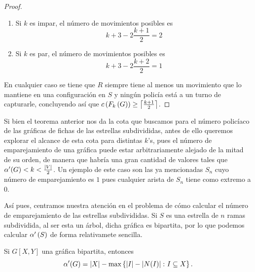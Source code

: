 \begin{proof}
    \begin{enumerate}
        \item Si $k$ es impar, el n\'umero de movimientos posibles es
                \[
                    k + 3 - 2\frac{k+1}{2} = 2
                \]
        \item Si $k$ es par, el n\'umero de movimientos posibles es
                \[
                    k + 3 - 2\frac{k+2}{2} = 1
                \]
    \end{enumerate}
    En cualquier caso se tiene que $R$ siempre tiene al menos un movimiento que
    lo mantiene en una configuraci\'on en $S$ y ning\'un polic\'ia est\'a a un
    turno de capturarle, concluyendo as\'i que $c\left( F_{k}\left( G\right)\right) \geq
    \left\lceil\frac{k+1}{2}\right\rceil$.

\end{proof}

\newpage

Si bien el teorema anterior nos da la cota que buscamos para el n\'umero
polic\'iaco de las gr\'aficas de fichas de las estrellas subdivididas, antes de
ello queremos explorar el alcance de esta cota para distintas $k$'s, pues el
n\'umero de emparejamiento de una gr\'afica puede estar arbitrariamente alejado
de la mitad de su orden, de manera que habr\'ia una gran cantidad de valores
tales que $\alpha'(G) < k <\frac{\left|V\right|}{2}$. Un ejemplo de este caso son las
ya mencionadas $S_n$ cuyo n\'umero de emparejamiento es $1$ pues cualquier
arista de $S_n$ tiene como extremo a $0$.

As\'i pues, centramos nuestra atenci\'on en el problema de c\'omo calcular el
n\'umero de emparejamiento de las estrellas subdivididas. Si $S$ es una estrella
de $n$ ramas subdividida, al ser esta un \'arbol, dicha gr\'afica es bipartita,
por lo que podemos calcular $\alpha'\left( S\right)$ de forma relativamete sencilla.

\begin{teorema}
\label{teo:ko}
    Si $G[X,Y]$ una gr\'afica bipartita, entonces
    \[
        \alpha'(G) = \left|X\right| - \max\left\{ \left|I\right| - \left|N(I)\right| \colon I\subseteq X\right\}.
    \]
\end{teorema}

